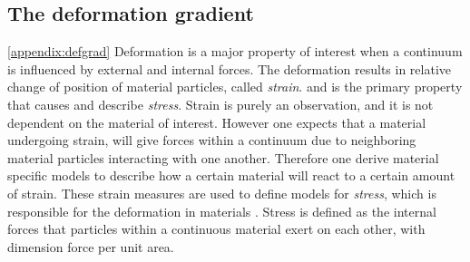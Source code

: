 \begin{appendices}




\chapter{The deformation gradient}
\ref{appendix:defgrad}
Deformation is a major property of interest when a continuum is influenced by external and internal forces.  The deformation results in relative change of position of material particles, called \textit{strain}. and is the primary property that causes and describe \textit{stress}. Strain is purely an observation, and it is not dependent on the material of interest. However one expects that a material undergoing strain, will give  forces within a continuum due to neighboring material particles interacting with one another. Therefore one derive material specific models to describe how a certain material will react to a certain amount of strain. These strain measures are used to define models for \textit{stress}, which is responsible for the deformation in materials \cite{Holzapfel2000}. Stress is defined as the internal forces that particles within a continuous material exert on each other, with dimension force per unit area.  \\


\end{appendices}

